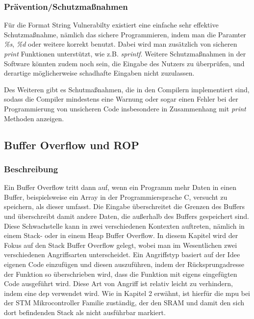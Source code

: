 \documentclass[a4paper,
DIV=13,
12pt,
BCOR=10mm,
department=FakIM,
oneside,
parskip=half,
automark,
listof=totocnumbered,
bibliography=totocnumbered,
acronym=totocnumbered
] {OTHRartcl}
\begin{document}
\subsubsection{Prävention/Schutzmaßnahmen}
Für die Format String Vulnerabilty existiert eine einfache sehr effektive Schutzmaßnahme, nämlich
das sichere Programmieren, indem man die Paramter \textit{\%s}, \textit{\%d} oder weitere korrekt benutzt.
Dabei wird man zusätzlich von sicheren \textit{print} Funktionen unterstützt, wie z.B. \textit{sprintf}.
Weitere Schutzmaßnahmen in der Software könnten zudem noch sein, die Eingabe des Nutzers zu überprüfen, und
derartige möglicherweise schadhafte Eingaben nicht zuzulassen.

Des Weiteren gibt es Schutmaßnahmen, die in den Compilern implementiert sind, sodass die Compiler mindestens eine Warnung oder sogar einen Fehler
bei der Programmierung von unsicheren Code insbesondere in Zusammenhang mit \textit{print} Methoden anzeigen.

\subsection{Buffer Overflow und ROP}
\subsubsection{Beschreibung}
Ein Buffer Overflow tritt dann auf, wenn ein Programm mehr Daten in einen Buffer, beispielsweise ein Array in der Programmiersprache C, versucht zu speichern, als
dieser umfasst. \cite{OWASP Buffer Overflow}
Die Eingabe überschreitet die Grenzen des Buffers und überschreibt damit andere Daten, die außerhalb des Buffers gespeichert sind.
Diese Schwachstelle kann in zwei verschiedenen Kontexten auftreten, nämlich in einem Stack- oder in einem Heap Buffer Overflow.
In diesem Kapitel wird der Fokus auf den Stack Buffer Overflow gelegt, wobei man im Wesentlichen zwei verschiedenen Angriffsarten unterscheidet.
Ein Angriffstyp basiert auf der Idee eigenen Code einzufügen und diesen auszuführen, indem der Rücksprungadresse der Funktion so überschrieben wird, dass die Funktion
mit eigens eingefügten Code ausgeführt wird. Diese Art von Angriff ist relativ leicht zu verhindern, indem eine \ac{dep} verwendet wird. \cite{IEEE Xplore ROP}
Wie in Kapitel 2 erwähnt, ist hierfür die \ac{mpu} bei der STM Mikrocontroller Familie zuständig, der den SRAM und damit den sich dort befindenden Stack als nicht ausführbar markiert.
\end{document}
